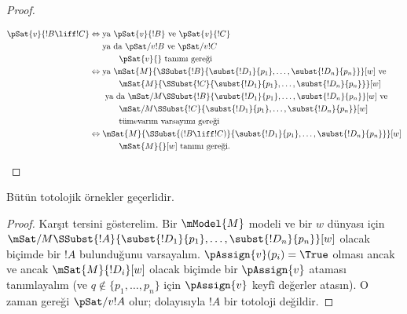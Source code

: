 \documentclass[../../../include/open-logic-section]{subfiles}
\begin{document}
\begin{proof}
\begin{enumerate}
{{\begin{align*}
        \pSat{v}{!B \liff !C} \Leftrightarrow {} &
        \text{ya } \pSat{v}{!B} \text{ ve } \pSat{v}{!C}\\
        & \text{ya da } \pSat/{v}{!B} \text{ ve } \pSat/{v}{!C}\\
        &\qquad \text{$\pSat{v}{}$ tanımı gereği}\\
        \Leftrightarrow {} &
        \text{ya } \mSat{M}{\SSubst{!B}{\subst{!D_1}{p_1}, \dots,
            \subst{!D_n}{p_n}}}[w] \text{ ve }\\
        & \qquad \mSat{M}{\SSubst{!C}{\subst{!D_1}{p_1}, \dots,
          \subst{!D_n}{p_n}}}[w]\\ 
        &  \text{ ya da } \mSat/{M}{\SSubst{!B}{\subst{!D_1}{p_1}, \dots,
            \subst{!D_n}{p_n}}}[w] \text{ ve }\\
        & \qquad \mSat/{M}{\SSubst{!C}{\subst{!D_1}{p_1}, \dots,
          \subst{!D_n}{p_n}}}[w]\\
        &\qquad\text{tümevarım varsayımı gereği}\\
        \Leftrightarrow {} &
        \mSat{M}{\SSubst{(!B \liff !C)}{\subst{!D_1}{p_1}, \dots,
          \subst{!D_n}{p_n}}}[w]\\
        &\qquad \text{$\mSat{M}{}[w]$ tanımı gereği}.
      \end{align*}}}{}
  \end{enumerate}
  \end{proof}

\begin{prop}
  Bütün totolojik örnekler geçerlidir.
\end{prop}

\begin{proof}
  Karşıt tersini gösterelim. Bir $\mModel{M}$ modeli ve bir $w$ dünyası için
  $\mSat/{M}{\SSubst{!A}{\subst{!D_1}{p_1}, \dots,
  \subst{!D_n}{p_n}}}[w]$ olacak biçimde bir $!A$ bulunduğunu varsayalım.
  $\pAssign{v}(p_i) = \True$ olması ancak ve ancak $\mSat{M}{!D_i}[w]$
  olacak biçimde bir $\pAssign{v}$ ataması tanımlayalım (ve $q \notin
  \{p_1, \dots, p_n \}$ için $\pAssign{v}$ keyfî değerler atasın). O zaman
   gereği $\pSat/{v}{!A}$ olur; dolayısıyla $!A$ bir
  totoloji değildir.
\end{proof}
\end{document}
